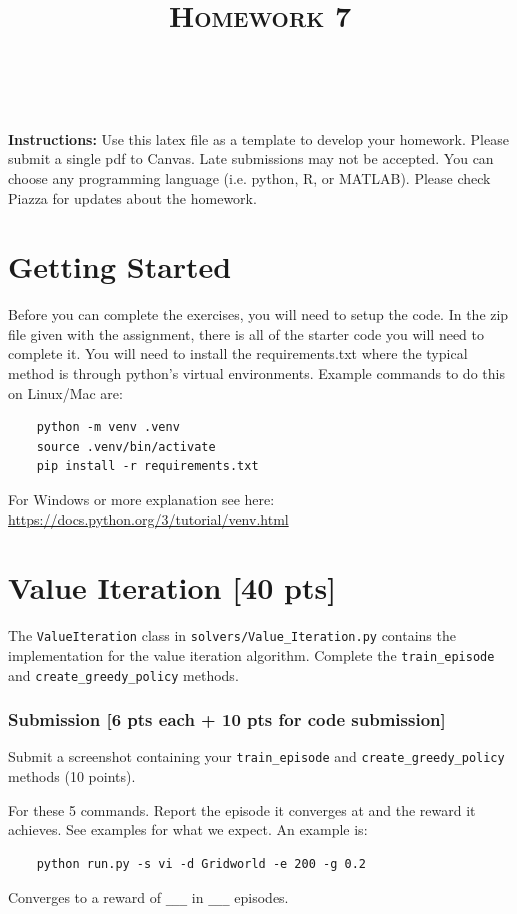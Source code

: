 \documentclass[a4paper]{article}
\title{\textsc{Homework 7}} %
\author{
\red{$>>$Huzaifa Mustafa Unjhawala$<<$} \\
}
\date{}
\theoremstyle{definition}
\begin{document}
\maketitle 

\textbf{Instructions:}
Use this latex file as a template to develop your homework. Please submit a single pdf to Canvas. Late submissions may not be accepted. You can choose any programming language (i.e. python, R, or MATLAB). Please check Piazza for updates about the homework.
\vspace{0.1in}

\section{Getting Started}
Before you can complete the exercises, you will need to setup the code.
%
In the zip file given with the assignment, there is all of the starter code you will need to complete it.
%
You will need to install the requirements.txt where the typical method is through python's virtual environments.
%
Example commands to do this on Linux/Mac are:
\begin{verbatim}
    python -m venv .venv
    source .venv/bin/activate
    pip install -r requirements.txt 
\end{verbatim}
%

For Windows or more explanation see here: \url{https://docs.python.org/3/tutorial/venv.html}

\section{Value Iteration [40 pts]}

The \verb|ValueIteration| class in \verb|solvers/Value_Iteration.py| contains the implementation for the value iteration algorithm. Complete the \verb|train_episode| and \verb|create_greedy_policy| methods.

\subsubsection*{Submission [6 pts each + 10 pts for code submission]}

Submit a screenshot containing your \verb|train_episode| and \verb|create_greedy_policy| methods (10 points). 

\vspace{5mm}
For these 5 commands. Report the episode it converges at and the reward it achieves. See examples for what we expect. An example is: \begin{verbatim}
    python run.py -s vi -d Gridworld -e 200 -g 0.2
\end{verbatim}
Converges to a reward of \verb|___| in \verb|___| episodes.
\end{document}

